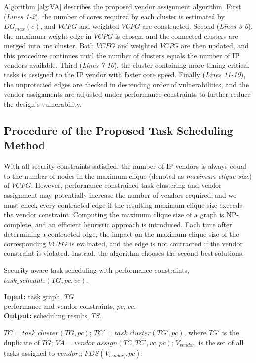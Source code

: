 \documentclass[10pt,journal, compsoc]{IEEEtran}
\begin{document}
Algorithm \ref{alg:VA} describes the proposed vendor assignment algorithm. First (\textit{Lines 1-2}), the number of cores required by each cluster is estimated by $DG_{max}(c)$, and $VCFG$ and weighted $VCPG$ are constructed. Second (\textit{Lines 3-6}), the maximum weight edge in $VCPG$ is chosen, and the connected clusters are merged into one cluster. Both $VCFG$ and weighted $VCPG$ are then updated, and this procedure continues until the number of clusters equals the number of IP vendors available. Third (\textit{Lines 7-10}), the cluster containing more timing-critical tasks is assigned to the IP vendor with faster core speed. Finally (\textit{Lines 11-19}), the unprotected edges are checked in descending order of vulnerabilities, and the vendor assignments are adjusted under performance constraints to further reduce the design's vulnerability.




\subsection{Procedure of the Proposed Task Scheduling Method}

With all security constraints satisfied, the number of IP vendors is always equal to the number of nodes in the maximum clique (denoted as \textit{maximum clique size}) of $VCFG$. However, performance-constrained task clustering and vendor assignment may potentially increase the number of vendors required, and we must check every contracted edge if the resulting maximum clique size exceeds the vendor constraint. Computing the maximum clique size of a graph is NP-complete, and an efficient heuristic approach \cite{article:CL} is introduced. Each time after determining a contracted edge, the impact on the maximum clique size of the corresponding $VCFG$ is evaluated, and the edge is not contracted if the vendor constraint is violated. Instead, the algorithm chooses the second-best solutions.




\begin{algorithm}[!h]
\caption{Security-aware task scheduling with performance constraints, $task\_schedule(TG, pc, vc)$.}
\label{alg:PCTS}
{\textbf{Input:}} task graph, $TG$\\
\hspace*{2.4em} performance and vendor constraints, $pc$, $vc$.\\
{\textbf{Output:}} scheduling results, $TS$.
\begin{algorithmic}[1]
\STATE $TC=task\_cluster(TG,pc)$;
\STATE $TC'=task\_cluster(TG',pc)$, where $TG'$ is the duplicate of $TG$;
\STATE $VA=vendor\_assign(TC, TC', vc, pc)$;
    \STATE $V_{vendor_i}$ is the set of all tasks assigned to $vendor_i$;
    \STATE $FDS(V_{vendor_i}, pc)$;%
\ENDFOR
\end{algorithmic}
\end{algorithm}
\end{document}
